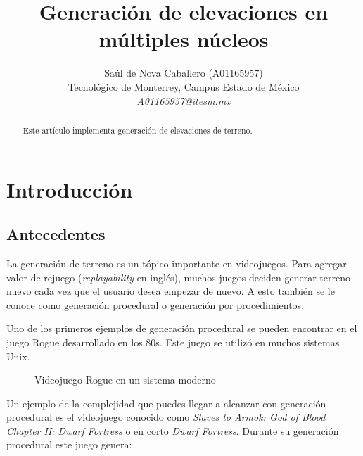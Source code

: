 \documentclass[10pt,letterpaper,oneside]{article}
\begin{document}
\renewcommand\abstractname{Resumen}
\renewcommand\refname{Referencias}
\renewcommand{\notesname}{Notas}


\newcommand\crule[3][black]{\textcolor{#1}{\rule{#2}{#3}}}

\title{Generación de elevaciones en múltiples núcleos}
\author{
\Large Saúl de Nova Caballero (A01165957)
\\
Tecnológico de Monterrey, Campus Estado de México
\\  
\Large \textit{A01165957@itesm.mx}}  

\maketitle

\begin{abstract}
Este artículo implementa generación de elevaciones de terreno. 
\end{abstract}

\section{Introducción}

\subsection{Antecedentes}

La generación de terreno es un tópico importante en videojuegos. Para agregar valor de rejuego (\textit{replayability} en inglés), muchos juegos deciden generar terreno nuevo cada vez que el usuario desea empezar de nuevo. A esto también se le conoce como generación procedural o generación por procedimientos.

Uno de los primeros ejemplos de generación procedural se pueden encontrar en el juego Rogue desarrollado en los 80s. Este juego se utilizó en muchos sistemas Unix.

\begin{figure}[H]
	\centering
	\caption{Videojuego Rogue en un sistema moderno}
	\label{fig:rogue}	
\end{figure}

Un ejemplo de la complejidad que puedes llegar a alcanzar con generación procedural es el videojuego conocido como \textit{Slaves to Armok: God of Blood Chapter II: Dwarf Fortress} o en corto \textit{Dwarf Fortress}. Durante su generación procedural este juego genera:
\end{document}
